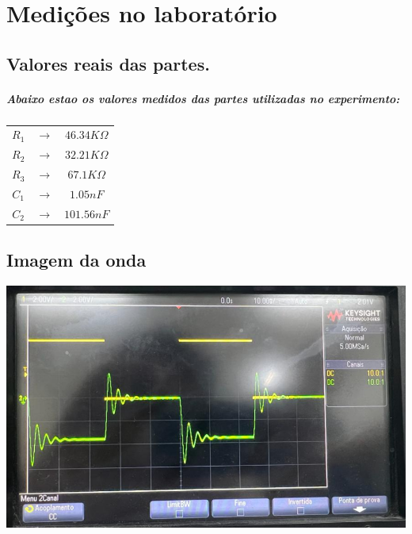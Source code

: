\documentclass[12pt,twoside, a4paper, twocolumn]{article}
\begin{document}
\newpage

\section{Medições no laboratório}

\subsection{Valores reais das partes.}
\subparagraph*{Abaixo estao os valores medidos das partes utilizadas no experimento:}

\begin{center}
    \begin{tabular}{ |ccc| }
        \hline
        $R_1$ & $\rightarrow$ & $46.34K\varOmega$ \\
        $R_2$ & $\rightarrow$ & $32.21K\varOmega$ \\
        $R_3$ & $\rightarrow$ & $67.1K\varOmega$  \\
        $C_1$ & $\rightarrow$ & $1.05nF$          \\
        $C_2$ & $\rightarrow$ & $101.56nF$        \\

        \hline
    \end{tabular}
\end{center}

\subsection{Imagem da onda}

\begin{adjustbox}{scale=0.4}
    \includegraphics{Figure_1.png}
\end{adjustbox}
\end{document}
